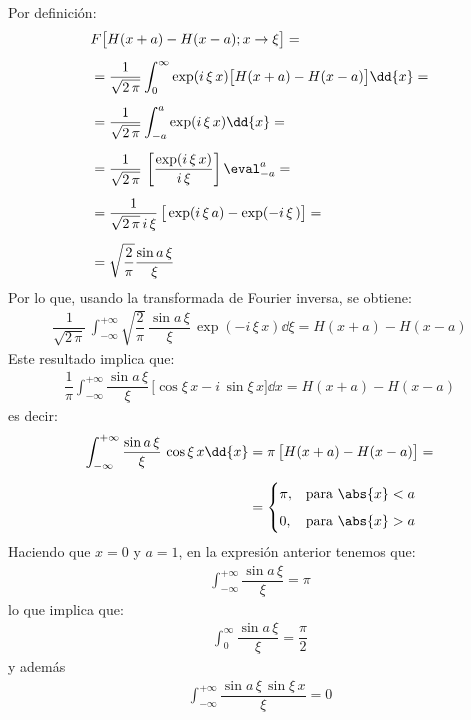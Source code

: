 Por definición:
\begin{align*}
&F \big[H(x + a) - H(x - a); x \to \xi\big] = \\[0.5em]
&= \dfrac{1}{\sqrt{2\, \pi}} \int_{0}^{\infty} \exp(i \, \xi \, x) \big[H(x + a) - H(x - a)\big] \dd{x} = \\[0.5em]
&= \dfrac{1}{\sqrt{2\, \pi}} \int_{-a}^{a} \exp(i \, \xi \, x) \dd{x} = \\[0.5em]
&= \dfrac{1}{\sqrt{2\, \pi}} \, \left[ \dfrac{\exp(i \, \xi \, x)}{i \, \xi} \right] \eval_{-a}^{a} = \\[0.5em]
&= \dfrac{1}{\sqrt{2\, \pi} \, i \, \xi} \, \big[\exp(i \, \xi \, a) - \exp(-i \, \xi \, ) \big] = \\[0.5em]
&= \sqrt{\dfrac{2}{\pi}} \dfrac{\sin a \, \xi}{\xi}
\end{align*}
Por lo que, usando la transformada de Fourier inversa, se obtiene:
\begin{align*}
\dfrac{1}{\sqrt{2 \, \pi}} \, \int_{-\infty}^{+\infty} \sqrt{\dfrac{2}{\pi}} \, \dfrac{\sin a \, \xi}{\xi} \,  \exp(- i \, \xi \, x) \dd{\xi}  = H(x + a) - H(x- a)
\end{align*}
Este resultado implica que:
\begin{align*}
\dfrac{1}{\pi} \int_{-\infty}^{+\infty} \dfrac{\sin a \, \xi}{\xi} \, \big[\cos \xi \, x - i \, \sin \xi \, x \big] \dd{x} = H(x + a) - H(x - a)
\end{align*}
es decir:
\begin{align*}
\int_{-\infty}^{+\infty} \dfrac{\sin a \, \xi}{\xi} \, \cos \xi \, x \dd{x} &= \pi \, \big[H(x + a) - H(x - a)\big]  = \\[0.5em]
&= \begin{cases}
\pi, & \mbox{para  } \abs{x} < a \\[0.5em]
0, & \mbox{para  } \abs{x} > a
\end{cases}
\end{align*}
Haciendo que $x = 0$ y $a = 1$, en la expresión anterior tenemos que:
\begin{align*}
\int_{-\infty}^{+\infty} \dfrac{\sin a \, \xi}{\xi} = \pi
\end{align*}
lo que implica que:
\begin{align*}
\int_{0}^{\infty} \dfrac{\sin a \, \xi}{\xi} = \dfrac{\pi}{2}
\end{align*}
y además
\begin{align*}
\int_{-\infty}^{+\infty} \dfrac{\sin a \, \xi \, \sin \xi \, x}{\xi} = 0
\end{align*}

